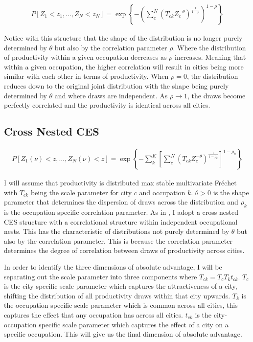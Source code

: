 \documentclass[10pt]{article}
\begin{document}
\begin{align*}
    P[Z_1 < z_1, \dots, Z_N < z_N] = \exp \left\{ - \left( \sum_{c}^{N} (T_{ck} Z_c^{- \theta})^{\frac{1}{1 - \rho}} \right)^{1 - \rho} \right\}
\end{align*}

Notice with this structure that the shape of the distribution is no longer purely determined by $\theta$ but also by the correlation parameter $\rho$. Where the distribution of productivity within a given occupation decreases as $\rho$ increases. Meaning that within a given occupation, the higher correlation will result in cities being more similar with each other in terms of productivity. When $\rho = 0$, the distribution reduces down to the original joint distribution with the shape being purely determined by $\theta$ and where draws are independent. As $\rho \rightarrow 1$, the draws become perfectly correlated and the productivity is identical across all cities.

\subsection{Cross Nested CES}

\begin{align}
    P[Z_1(\nu) < z, \dots, Z_N(\nu) < z] = \exp \left\{ - \sum_{k}^{K} \left[ \sum_{c}^{N} (T_{ck} Z_c^{- \theta})^{\frac{1}{1 - \rho_k}} \right]^{1 - \rho_k} \right\}
\end{align}

I will assume that productivity is distributed max stable multivariate Fr\'{e}chet with $T_{ck}$ being the scale parameter for city $c$ and occupation $k$. $\theta > 0$ is the shape parameter that determines the dispersion of draws across the distribution and $\rho_k$ is the occupation specific correlation parameter. As in \cite{lindandramondo}, I adopt a cross nested CES structure with a correlational structure within independent occupational nests. This has the characteristic of distributions not purely determined by $\theta$ but also by the correlation parameter. This is because the correlation parameter determines the degree of correlation between draws of productivity across cities.

In order to identify the three dimensions of absolute advantage, I will be separating out the scale parameter into three components where $T_{ck} = T_c T_k t_{ck}$. $T_c$ is the city specific scale parameter which captures the attractiveness of a city, shifting the distribution of all productivity draws within that city upwards. $T_k$ is the occupation specific scale parameter which is common across all cities, this captures the effect that any occupation has across all cities. $t_{ck}$ is the city-occupation specific scale parameter which captures the effect of a city on a specific occupation. This will give us the final dimension of absolute advantage.
\end{document}
